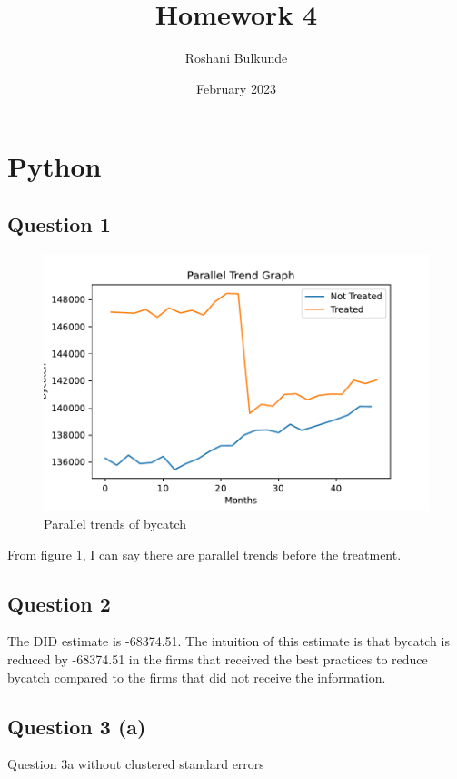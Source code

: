 \documentclass{article}
\title{Homework 4}
\author{Roshani Bulkunde}
\date{February 2023}
\begin{document}
\maketitle

\section{Python}

\subsection{Question 1}

\begin{figure}[ht]
    \centering
    \includegraphics[scale = 0.7]{paralleltrend.pdf}
    \caption{Parallel trends of bycatch}
    \label{fig:paralleltrend}
\end{figure}

From figure \ref{fig:paralleltrend}, I can say there are parallel trends before the treatment. 

\subsection{Question 2}
The DID estimate is -68374.51. The intuition of this estimate is that bycatch is reduced by -68374.51 in the firms that received the best practices to reduce bycatch compared to the firms that did not receive the information.

\subsection{Question 3 (a)}
\begin{table}[ht]
    \centering
    
    \caption{Question 3a without clustered standard errors }
    \label{tab:DID3a_python}
\end{table}
\end{document}
